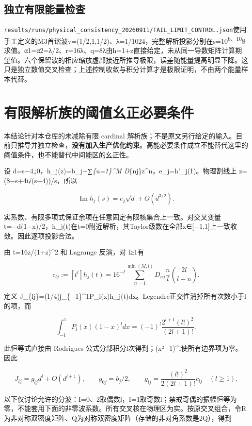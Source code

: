 \documentclass[
  10pt,
  a4paper,
]{article}
\begin{document}
\subsection{独立有限能量检查}\label{ux72ecux7acbux6709ux9650ux80fdux91cfux68c0ux67e5}

\texttt{results/runs/physical\_consistency\_20260911/TAIL\_LIMIT\_CONTROL.json}使用手工定义的M3首谐波v=(1/2,1,1/2)、λ=1/1024，完整解析投影分别在s=10\textsuperscript{6、10}8求值。α1=α2=λ/2、r=16λ、q=8λ由h=1+z直接给定，未从同一导数矩阵计算期望值。六个保留波的相应缩放虚部接近所推导极限，误差随能量提高明显下降。这只是独立数值交叉检查；上述控制收敛与积分计算才是极限证明，不由两个能量样本代替。

\newpage

\section{有限解析族的阈值幺正必要条件}\label{ux6709ux9650ux89e3ux6790ux65cfux7684ux9608ux503cux5e7aux6b63ux5fc5ux8981ux6761ux4ef6}

本结论针对本仓库的未减除有限 cardinal
解析族；不是原文另行给定的输入。目前只推导并独立检查，\textbf{没有加入生产优化约束}。高能必要条件成立不能替代这里的阈值条件，也不能替代中间能区的幺正性。

设 d=s−4↓0，h\_j(z)=b\_j+∑\emph{\{n=1\}\^{}M
D}\{nj\}z\^{}n，e\_j=h'\_j(1)。物理割线上 z=(8−s+4i√(s−4))/s，所以

\[
\operatorname{Im}h_j(s)=e_j\sqrt d+O(d^{3/2}).
\]

实系数、有限多项式保证余项在任意固定有限核集合上一致。对交叉变量
t=−d(1−x)/2，h\_j(t)在t=0附近解析，其Taylor级数在全部x∈{[}−1,1{]}上一致收敛。因此逐项投影合法。

由 t=16z/(1+z)\^{}2 和 Lagrange 反演，对 l≥1有

\[
c_{lj}:=[t^l]h_j(t)=16^{-l}\sum_{n=1}^{\min(M,l)}D_{nj}\frac nl {2l\choose l-n}.
\]

定义
J\_\{lj\}=(1/4)∫\_\{−1\}\^{}1P\_l(x)h\_j(t)dx。Legendre正交性消掉所有次数小于l的项，而

\[
\int_{-1}^1P_l(x)(1-x)^l dx
=(-1)^l\frac{2^{l+1}(l!)^2}{(2l+1)!}.
\]

此恒等式直接由 Rodrigues
公式分部积分l次得到；(x²−1)\^{}l使所有边界项为零。因此

\[
J_{lj}=g_{lj}d^l+O(d^{l+1}),\qquad
g_{0j}=b_j/2,\qquad
g_{lj}=\frac{(l!)^2}{2(2l+1)!}c_{lj}\quad(l\ge1).
\]

以下仅讨论允许的分波：I=0、2取偶数l，I=1取奇数l；禁戒奇偶的振幅恒等为零，不能套用下面的非零波系数。所有交叉核在物理区为实。按原交叉组合，令R为非对称双密度矩阵、Q为对称双密度矩阵（存储的非对角系数是2Q），得到
\end{document}
